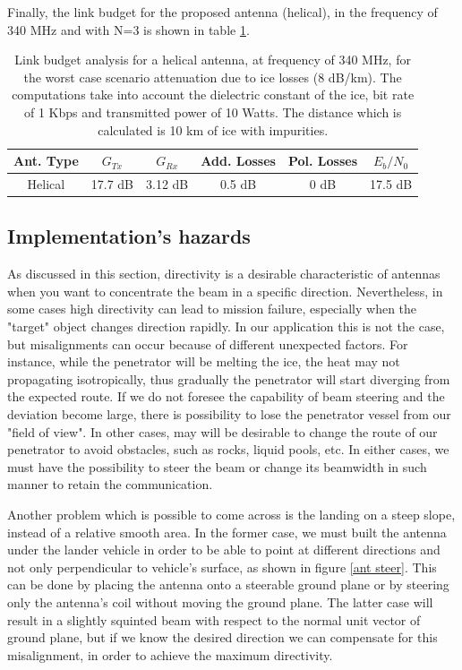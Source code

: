 Finally, the link budget for the proposed antenna (helical), in the frequency of 340 MHz and with N=3 is shown in table \ref{table:link_budget_helix}.

\begin{table}[ht]
\centering
\begin{tabular}{| c | c | c | c | c | c |}
\hline
 \textbf{Ant. Type} & \textbf{$G_{Tx}$} & \textbf{$G_{Rx}$} & \textbf{Add. Losses} & \textbf{Pol. Losses} & \textbf{$E_{b}/N_{0}$} \\ 
 \hline
 Helical & 17.7 dB & 3.12 dB & 0.5 dB & 0 dB & 17.5 dB \\
 \hline
\end{tabular}
\caption{Link budget analysis for a helical antenna, at frequency of 340 MHz, for the worst case scenario attenuation due to ice losses (8 dB/km). The computations take into account the dielectric constant of the ice, bit rate of 1 Kbps and transmitted power of 10 Watts. The distance which is calculated is 10 km of ice with impurities.}
\label{table:link_budget_helix}
\end{table}

\subsection{Implementation's hazards}
As discussed in this section, directivity is a desirable characteristic of antennas when you want to concentrate the beam in a specific direction. Nevertheless, in some cases high directivity can lead to mission failure, especially when the "target" object changes direction rapidly. In our application this is not the case, but misalignments can occur because of different unexpected factors. For instance, while the penetrator will be melting the ice, the heat may not propagating isotropically, thus gradually the penetrator will start diverging from the expected route. If we do not foresee the capability of beam steering and the deviation become large, there is possibility to lose the penetrator vessel from our "field of view". In other cases, may will be desirable to change the route of our penetrator to avoid obstacles, such as rocks, liquid pools, etc. In either cases, we must have the possibility to steer the beam or change its beamwidth in such manner to retain the communication.

Another problem which is possible to come across is the landing on a steep slope, instead of a relative smooth area. In the former case, we must built the antenna under the lander vehicle in order to be able to point at different directions and not only perpendicular to vehicle's surface, as shown in figure \ref{ant steer}. This can be done by placing the antenna onto a steerable ground plane or by steering only the antenna's coil without moving the ground plane. The latter case will result in a slightly squinted beam with respect to the normal unit vector of ground plane, but if we know the desired direction we can compensate for this misalignment, in order to achieve the maximum directivity.

